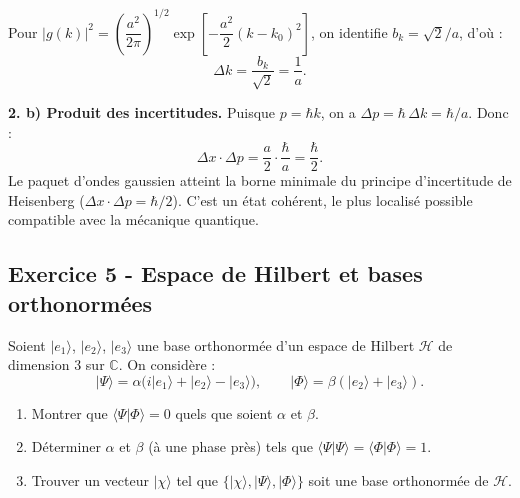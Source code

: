 \documentclass[12pt,a4paper]{article}
\begin{document}
\begin{boitecorrige}
Pour $|g(k)|^2 = \left(\dfrac{a^2}{2\pi}\right)^{1/2}\exp\!\left[-\dfrac{a^2}{2}(k-k_0)^2\right]$,
on identifie $b_k = \sqrt{2}/a$, d'où :
\[
  \Delta k = \frac{b_k}{\sqrt{2}} = \frac{1}{a}.
\]

\textbf{2. b) Produit des incertitudes.}
Puisque $p = \hbar k$, on a $\Delta p = \hbar\,\Delta k = \hbar/a$. Donc :
\[
  \Delta x\cdot\Delta p = \frac{a}{2}\cdot\frac{\hbar}{a} = \frac{\hbar}{2}.
\]
Le paquet d'ondes gaussien atteint la borne minimale du principe d'incertitude de Heisenberg
($\Delta x\cdot\Delta p = \hbar/2$). C'est un état cohérent, le plus localisé possible compatible
avec la mécanique quantique.
\end{boitecorrige}

\subsection*{Exercice 5 - Espace de Hilbert et bases orthonormées \niveau{\difficile}}

\begin{boiteexercice}
Soient $|e_1\rangle$, $|e_2\rangle$, $|e_3\rangle$ une base orthonormée d'un espace de Hilbert
$\mathcal{H}$ de dimension 3 sur $\mathbb{C}$. On considère :
\[
  |\Psi\rangle = \alpha(i|e_1\rangle + |e_2\rangle - |e_3\rangle),
  \qquad
  |\Phi\rangle = \beta(|e_2\rangle + |e_3\rangle).
\]
\begin{enumerate}
  \item Montrer que $\langle\Psi|\Phi\rangle = 0$ quels que soient $\alpha$ et $\beta$.
  \item Déterminer $\alpha$ et $\beta$ (à une phase près) tels que $\langle\Psi|\Psi\rangle =
    \langle\Phi|\Phi\rangle = 1$.
  \item Trouver un vecteur $|\chi\rangle$ tel que $\{|\chi\rangle, |\Psi\rangle, |\Phi\rangle\}$
    soit une base orthonormée de $\mathcal{H}$.
\end{enumerate}
\end{boiteexercice}
\end{document}
